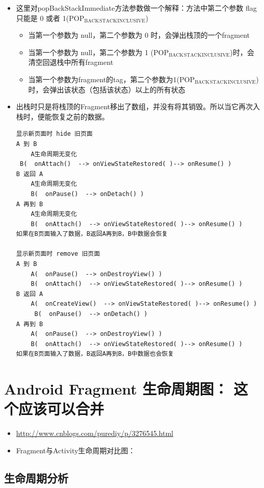 \documentclass[9pt, b5paaper]{book}
\begin{document}
\begin{itemize}
\item 这里对popBackStackImmediate方法参数做一个解释：方法中第二个参数 flag 只能是 0 或者 1(POP$_{\text{BACK}}$$_{\text{STACK}}$$_{\text{INCLUSIVE}}$)
\begin{itemize}
\item 当第一个参数为 null，第二个参数为 0 时，会弹出栈顶的一个fragment
\item 当第一个参数为 null，第二个参数为 1 (POP$_{\text{BACK}}$$_{\text{STACK}}$$_{\text{INCLUSIVE}}$)时，会清空回退栈中所有fragment
\item 当第一个参数为fragment的tag，第二个参数为1(POP$_{\text{BACK}}$$_{\text{STACK}}$$_{\text{INCLUSIVE}}$)时，会弹出该状态（包括该状态）以上的所有状态
\end{itemize}
\item 出栈时只是将栈顶的Fragment移出了数组，并没有将其销毁。所以当它再次入栈时，便能恢复之前的数据。
\begin{verbatim}
显示新页面时 hide 旧页面
A 到 B
    A生命周期无变化
 B(  onAttach()  --> onViewStateRestored( )--> onResume() )
B 返回 A
    A生命周期无变化
    B(  onPause()  --> onDetach() )
A 再到 B
    A生命周期无变化
    B(  onAttach()  --> onViewStateRestored( )--> onResume() )
如果在B页面输入了数据，B返回A再到B，B中数据会恢复

显示新页面时 remove 旧页面
A 到 B
    A(  onPause()  --> onDestroyView() )
    B(  onAttach()  --> onViewStateRestored( )--> onResume() )
B 返回 A
    A(  onCreateView()  --> onViewStateRestored( )--> onResume() )
     B(  onPause()  --> onDetach() )
A 再到 B
    A(  onPause()  --> onDestroyView() )
    B(  onAttach()  --> onViewStateRestored( )--> onResume() )
如果在B页面输入了数据，B返回A再到B，B中数据也会恢复
\end{verbatim}
\end{itemize}

\chapter{Android Fragment 生命周期图： 这个应该可以合并}
\label{sec-3}
\begin{itemize}
\item \url{http://www.cnblogs.com/purediy/p/3276545.html}
\item Fragment与Activity生命周期对比图：
\end{itemize}

\section{生命周期分析}
\label{sec-3-1}
\end{document}

